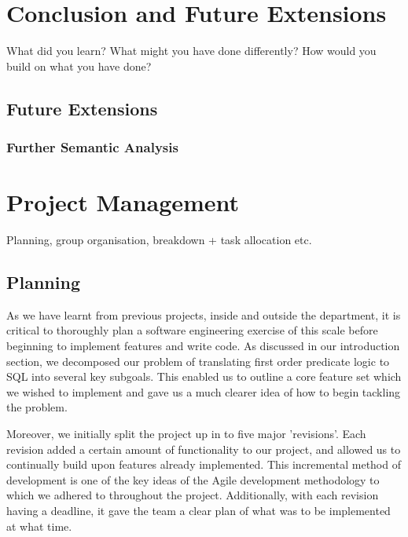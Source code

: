 \documentclass[a4paper, 11pt]{article}
\begin{document}
\section{Conclusion and Future Extensions}
  What did you learn? What might you have done differently?
  How would you build on what you have done?

  \subsection{Future Extensions}

    \subsubsection{Further Semantic Analysis}

\section{Project Management}
  Planning, group organisation, breakdown + task allocation etc.

  \subsection{Planning}

    As we have learnt from previous projects, inside and outside the
    department, it is critical to thoroughly plan a software engineering
    exercise of this scale before beginning to implement features and write
    code. As discussed in our introduction section, we decomposed our problem
    of translating first order predicate logic to SQL into several key
    subgoals. This enabled us to outline a core feature set which we wished to
    implement and gave us a much clearer idea of how to begin tackling the
    problem.

    Moreover, we initially split the project up in to five major 'revisions'.
    Each revision added a certain amount of functionality to our project, and
    allowed us to continually build upon features already implemented. This
    incremental method of development is one of the key ideas of the Agile
    development methodology to which we adhered to throughout the project.
     Additionally, with each revision having a
    deadline, it gave the team a clear plan of what was to be implemented at
    what time.
\end{document}
